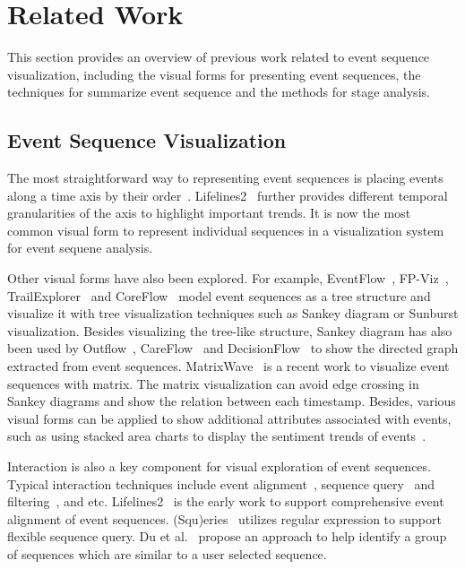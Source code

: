 \section{Related Work}
\label{section:relatedwork}

This section provides an overview of previous work related to event sequence visualization, including the visual forms for presenting event sequences, the techniques for summarize event sequence and the methods for stage analysis.

\subsection{Event Sequence Visualization}

The most straightforward way to representing event sequences is placing events along a time axis by their order~\cite{plaisant1996lifelines,cloudlines11,zhao2013timeslice}. Lifelines2~\cite{wang2009temporal} further provides different temporal granularities of the axis to highlight important trends. It is now the most common visual form to represent individual sequences in a visualization system for event sequene analysis.

Other visual forms have also been explored. For example, EventFlow~\cite{wongsuphasawat2011lifeflow, monroe2013temporal}, FP-Viz~\cite{stasko2000focus+}, TrailExplorer~\cite{shen2010trail, shen2012visual} and CoreFlow~\cite{liu2017coreflow} model event sequences as a tree structure and visualize it with tree visualization techniques such as Sankey diagram or Sunburst visualization. Besides visualizing the tree-like structure, Sankey diagram has also been used by Outflow~\cite{wongsuphasawat2012outflow}, CareFlow~\cite{perer2013data} and  DecisionFlow~\cite{gotz2014decisionflow} to show the directed graph extracted from event sequences. MatrixWave~\cite{zhao2015matrixwave} is a recent work to visualize event sequences with matrix. The matrix visualization can avoid edge crossing in Sankey diagrams and show the relation between each timestamp. Besides, various visual forms can be applied to show additional attributes associated with events, such as using stacked area charts to display the sentiment trends of events~\cite{lu2016exploring}.

Interaction is also a key component for visual exploration of event sequences. Typical interaction techniques include event alignment~\cite{wang2008aligning,wang2009temporal}, sequence query~\cite{zgraggen2015s,krause2016supporting,gotz2014decisionflow} and filtering~\cite{wongsuphasawat2009finding,du2016eventaction,du2016tvcg}, and etc. Lifelines2~\cite{wang2008aligning,wang2009temporal} is the early work to support comprehensive event alignment of event sequences. (S\textbar qu)eries~\cite{zgraggen2015s} utilizes regular expression to support flexible sequence query. Du et al.~\cite{du2016eventaction} propose an approach to help identify a group of sequences which are similar to a user selected sequence. 

